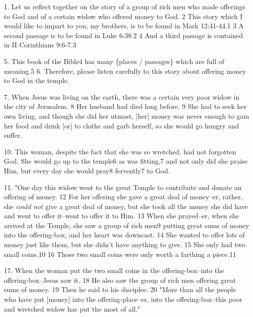 \setcounter{footnote}{0}


1. Let us reflect together on the story of a group of rich men who made offerings
to God and of a certain widow who offered money to God. 2 This story which I would
like to impart to you, my brothers, is to be found in Mark 12:41-44.1 3 A second
passage is to be found in Luke 6:38.2 4 And a third passage is contained in II
Corinthians 9:6-7.3

5. This book of the Bible4 has many \{places / passages\} which are full of meaning.5
6. Therefore, please listen carefully to this story about offering money to God
in the temple.

7. When Jesus was living on the earth, there was a certain very poor widow in the
city of Jerusalem. 8 Her husband had died long before. 9 She had to seek her own
living, and though she did her utmost, [her] money was never enough to gain her
food and drink [or] to clothe and garb herself, so she would go hungry and suffer.

10. This woman, despite the fact that she was so wretched, had not forgotten God.
She would go up to the temple6 as was fitting,7 and not only did she praise Him,
but every day she would pray8 fervently7 to God.

11. "One day this widow went to the great Temple to contribute and donate
an offering of money. 12 For her offering she gave a great deal of money--er, rather,
she \textit{could not} give a great deal of money, but she took all the money she
did have and went to offer it--went to offer it to Him. 13 When she prayed--er,
when she arrived at the Temple, she saw a group of rich men9 putting great sums
of money into the offering-box, and her heart was downcast. 14 She wanted to offer
lots of money just like them, but she didn't have anything to give. 15 She only
had two small coins.10 16 Those two small coins were only worth a farthing a piece.11

17. When the woman put the two small coins in the offering-box--into the offering-box--Jesus
saw it. 18 He also saw the group of rich men offering great sums of money. 19 Then
he said to his disciples: 20 "More than all the people who have put [money]
into the offering-place--er, into the offering-box--this poor and wretched widow
has put the most of all."

